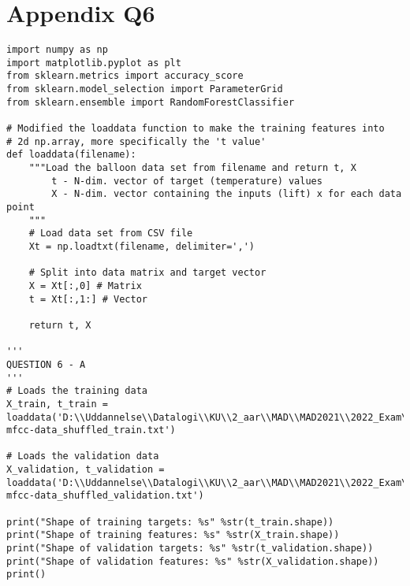 \section{Appendix Q6}

\begin{verbatim}
import numpy as np
import matplotlib.pyplot as plt
from sklearn.metrics import accuracy_score
from sklearn.model_selection import ParameterGrid
from sklearn.ensemble import RandomForestClassifier

# Modified the loaddata function to make the training features into
# 2d np.array, more specifically the 't value'
def loaddata(filename):
    """Load the balloon data set from filename and return t, X
        t - N-dim. vector of target (temperature) values
        X - N-dim. vector containing the inputs (lift) x for each data point
    """
    # Load data set from CSV file
    Xt = np.loadtxt(filename, delimiter=',')
    
    # Split into data matrix and target vector
    X = Xt[:,0] # Matrix
    t = Xt[:,1:] # Vector
    
    return t, X

'''
QUESTION 6 - A
'''
# Loads the training data
X_train, t_train = loaddata('D:\\Uddannelse\\Datalogi\\KU\\2_aar\\MAD\\MAD2021\\2022_Exam\\exam_data\\data\\accent-mfcc-data_shuffled_train.txt')

# Loads the validation data
X_validation, t_validation = loaddata('D:\\Uddannelse\\Datalogi\\KU\\2_aar\\MAD\\MAD2021\\2022_Exam\\exam_data\\data\\accent-mfcc-data_shuffled_validation.txt')

print("Shape of training targets: %s" %str(t_train.shape))
print("Shape of training features: %s" %str(X_train.shape))
print("Shape of validation targets: %s" %str(t_validation.shape))
print("Shape of validation features: %s" %str(X_validation.shape))
print()



\end{verbatim}
